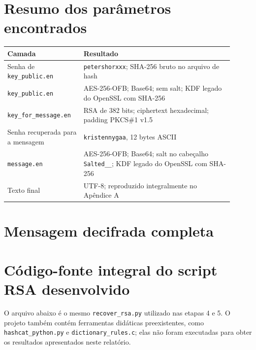 \documentclass[11pt,a4paper]{article}
\newcommand{\code}[1]{\texttt{#1}}
\begin{document}
\section{Resumo dos parâmetros encontrados}
\begin{center}
\begin{tabular}{p{0.30\linewidth}p{0.61\linewidth}}
\toprule
Camada & Resultado \\
\midrule
Senha de \code{key\_public.en} & \code{petershorxxx}; SHA-256 bruto no arquivo de hash \\
\code{key\_public.en} & AES-256-OFB; Base64; sem salt; KDF legado do OpenSSL com SHA-256 \\
\code{key\_for\_message.en} & RSA de 382 bits; ciphertext hexadecimal; padding PKCS\#1 v1.5 \\
Senha recuperada para a mensagem & \code{kristennygaa}, 12 bytes ASCII \\
\code{message.en} & AES-256-OFB; Base64; salt no cabeçalho \code{Salted\_\_}; KDF legado do OpenSSL com SHA-256 \\
Texto final & UTF-8; reproduzido integralmente no Apêndice A \\
\bottomrule
\end{tabular}
\end{center}

\appendix
\section{Mensagem decifrada completa}

\section{Código-fonte integral do script RSA desenvolvido}
O arquivo abaixo é o mesmo \code{recover\_rsa.py} utilizado nas etapas 4 e 5. O projeto também contém ferramentas didáticas preexistentes, como \code{hashcat\_python.py} e \code{dictionary\_rules.c}; elas não foram executadas para obter os resultados apresentados neste relatório.
\end{document}
